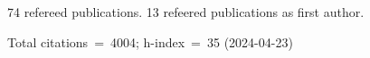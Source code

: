 74 refereed publications. 13 refeered publications as first author.

Total citations~=~4004; h-index~=~35 (2024-04-23)